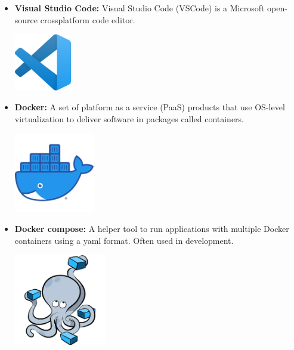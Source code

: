 \begin{itemize}
    \item \textbf{Visual Studio Code:} \newline Visual Studio Code (VSCode) is a Microsoft open-source crossplatform code editor. \newline \newline
          \begin{minipage}{\linewidth}
              \centering
              \includegraphics[width=2.5cm]{src/assets/logos/vscode_512x512.png}
          \end{minipage}
    \item \textbf{Docker:} \newline A set of platform as a service (PaaS) products that use OS-level virtualization to deliver software in packages called containers. \newline \newline
          \begin{minipage}{\linewidth}
              \centering
              \includegraphics[width=3.5cm]{src/assets/logos/docker_512x512.png}
          \end{minipage}
    \item \textbf{Docker compose:} \newline A helper tool to run applications with multiple Docker containers using a yaml format. Often used in development. \newline \newline
          \begin{minipage}{\linewidth}
              \centering
              \includegraphics[width=4cm]{src/assets/logos/docker-compose_667x667.png}
          \end{minipage}
          \newpage


\end{itemize}
